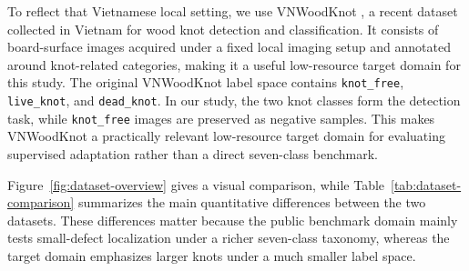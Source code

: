 \documentclass[journal,article,submit,moreauthors,pdftex]{Definitions/tsp}
\begin{document}
To reflect that Vietnamese local setting, we use VNWoodKnot  \citep{TRAN2025112039}, a recent dataset collected in Vietnam for wood knot detection and classification. It consists of board-surface images acquired under a fixed local imaging setup and annotated around knot-related categories, making it a useful low-resource target domain for this study. The original VNWoodKnot label space contains \texttt{knot\_free}, \texttt{live\_knot}, and \texttt{dead\_knot}. In our study, the two knot classes form the detection task, while \texttt{knot\_free} images are preserved as negative samples. This makes VNWoodKnot a practically relevant low-resource target domain for evaluating supervised adaptation rather than a direct seven-class benchmark.


Figure~\ref{fig:dataset-overview} gives a visual comparison, while Table~\ref{tab:dataset-comparison} summarizes the main quantitative differences between the two datasets. These differences matter because the public benchmark domain mainly tests small-defect localization under a richer seven-class taxonomy, whereas the target domain emphasizes larger knots under a much smaller label space.
\end{document}
